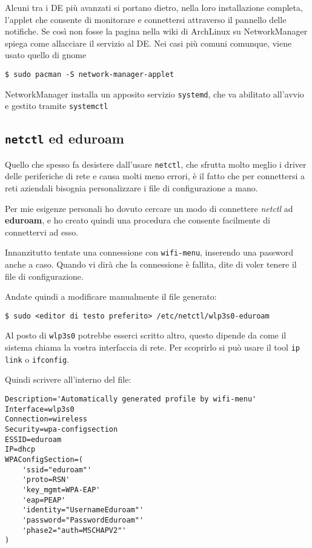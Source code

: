 \documentclass[twoside,italian]{book}
\newcommand{\code}[1]{\texttt{#1}}
\newcommand{\arch}{ArchLinux}
\begin{document}
    Alcuni tra i \ac{DE} più avanzati si portano dietro, nella loro installazione completa, l'applet che consente di monitorare e connettersi attraverso il pannello delle notifiche. Se così non fosse la pagina nella wiki di \arch{} su NetworkManager spiega come allacciare il servizio al \ac{DE}.
    Nei casi più comuni comunque, viene usato quello di gnome 
    \begin{lstlisting}
$ sudo pacman -S network-manager-applet
    \end{lstlisting}
    
    NetworkManager installa un apposito servizio \code{systemd}, che va abilitato all'avvio e gestito tramite \code{systemctl}
    
\subsection{\code{netctl} ed eduroam}
    Quello che spesso fa desistere dall'usare \code{netctl}, che sfrutta molto meglio i driver delle periferiche di rete e causa molti meno errori, è il fatto che per connettersi a reti aziendali bisognia personalizzare i file di configurazione a mano.
    
    Per mie esigenze personali ho dovuto cercare un modo di connettere \textit{netctl} ad \textbf{eduroam}, e ho creato quindi una procedura che consente facilmente di connettervi ad esso.
    
    Innanzitutto tentate una connessione con \code{wifi-menu}, inserendo una password anche a caso. Quando vi dirà che la connessione è fallita, dite di voler tenere il file di configurazione.
    
    Andate quindi a modificare manualmente il file generato:
    \begin{lstlisting}
$ sudo <editor di testo preferito> /etc/netctl/wlp3s0-eduroam
    \end{lstlisting}
    
    \begin{tcolorbox}[floatplacement=b,width=\textwidth,title={NOTA BENE:}, colback={lightgray},colbacktitle=gray,coltitle=white,colupper=black]
        Al posto di \code{wlp3s0} potrebbe esserci scritto altro, questo dipende da come il sistema chiama la vostra interfaccia di rete. Per scoprirlo si può usare il tool \code{ip link} o \code{ifconfig}.
    \end{tcolorbox}
    
    Quindi scrivere all'interno del file:
\begin{lstlisting}
Description='Automatically generated profile by wifi-menu'
Interface=wlp3s0
Connection=wireless
Security=wpa-configsection
ESSID=eduroam
IP=dhcp
WPAConfigSection=(
    'ssid="eduroam"'
    'proto=RSN'
    'key_mgmt=WPA-EAP'
    'eap=PEAP'
    'identity="UsernameEduroam"'
    'password="PasswordEduroam"'
    'phase2="auth=MSCHAPV2"'
)
\end{lstlisting}
\end{document}
